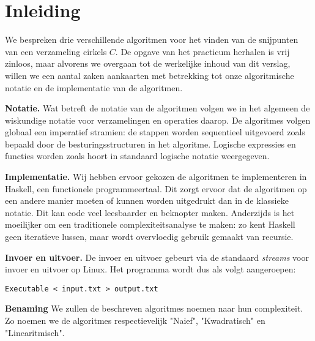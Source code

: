 \section{Inleiding}
We bespreken drie verschillende algoritmen voor het vinden van de
snijpunten van een verzameling cirkels $C$. De opgave van het
practicum herhalen is vrij zinloos, maar alvorens we overgaan tot de
werkelijke inhoud van dit verslag, willen we een aantal zaken
aankaarten met betrekking tot onze algoritmische notatie en de
implementatie van de algoritmen.

\textbf{Notatie.} Wat betreft de notatie van de algoritmen volgen we in het algemeen de
wiskundige notatie voor verzamelingen en operaties daarop. De
algoritmes volgen globaal een imperatief stramien: de stappen worden
sequentieel uitgevoerd zoals bepaald door de besturingsstructuren in
het algoritme. Logische expressies en functies worden zoals hoort in
standaard logische notatie weergegeven.

\textbf{Implementatie.} Wij hebben ervoor gekozen de algoritmen te
implementeren in Haskell, een functionele programmeertaal. Dit zorgt
ervoor dat de algoritmen op een andere manier moeten of kunnen worden
uitgedrukt dan in de klassieke notatie. Dit kan code veel leesbaarder
en beknopter maken. Anderzijds is het moeilijker om een traditionele
complexiteitsanalyse te maken: zo kent Haskell geen iteratieve lussen,
maar wordt overvloedig gebruik gemaakt van recursie.

\textbf{Invoer en uitvoer.} De invoer en uitvoer gebeurt via de
standaard \textit{streams} voor invoer en uitvoer op Linux. Het
programma wordt dus als volgt aangeroepen:
\begin{verbatim}
Executable < input.txt > output.txt
\end{verbatim}

\textbf{Benaming} We zullen de beschreven algoritmes noemen naar hun complexiteit. Zo noemen we de algoritmes respectievelijk "Naief", "Kwadratisch" en "Linearitmisch".


